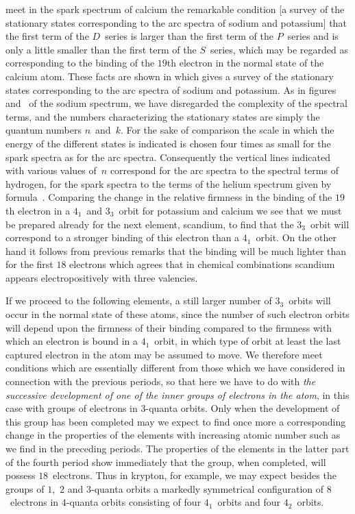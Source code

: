 meet in the spark spectrum of calcium the remarkable condition
[a survey of the stationary states corresponding to the arc spectra of sodium and potassium]
that the first term of the $D$~series is larger than the first term of
the $P$~series and is only a little smaller than the first term of the
$S$~series, which may be regarded as corresponding to the binding
of the $19$th electron in the normal state of the calcium atom.
These facts are shown in  which gives a survey of the
stationary states corresponding to the arc spectra of sodium and
potassium. As in figures  and~ of the sodium spectrum, we
have disregarded the complexity of the spectral terms, and the
numbers characterizing the stationary states are simply the quantum
numbers $n$~and~$k$. For the sake of comparison the scale in which the
energy of the different states is indicated is chosen four times as
small for the spark spectra as for the arc spectra. Consequently
the vertical lines indicated with various values of~$n$ correspond for
the arc spectra to the spectral terms of hydrogen, for the spark
spectra to the terms of the helium spectrum given by formula~.
Comparing the change in the relative firmness in the binding of
the $19$th electron in a $4_{1}$~and $3_{3}$~orbit for potassium and calcium we
see that we must be prepared already for the next element,
scandium, to find that the $3_{3}$~orbit will correspond to a stronger
binding of this electron than a $4_{1}$~orbit. On the other hand it
follows from previous remarks that the binding will be much lighter
than for the first $18$ electrons which agrees that in chemical combinations
scandium appears electropositively with three valencies.

If we proceed to the following elements, a still larger number of
$3_{3}$~orbits will occur in the normal state of these atoms, since the
number of such electron orbits will depend upon the firmness of
their binding compared to the firmness with which an electron is
bound in a $4_{1}$~orbit, in which type of orbit at least the last captured
electron in the atom may be assumed to move. We therefore meet
conditions which are essentially different from those which we have
considered in connection with the previous periods, so that here
we have to do with \emph{the successive development of one of the inner
groups of electrons in the atom}, in this case with groups of electrons
in $3$-quanta orbits. Only when the development of this group has
been completed may we expect to find once more a corresponding
change in the properties of the elements with increasing atomic
number such as we find in the preceding periods. The properties
of the elements in the latter part of the fourth period show
immediately that the group, when completed, will possess $18$~electrons.
Thus in krypton, for example, we may expect besides
the groups of $1$,~$2$ and $3$-quanta orbits a markedly symmetrical
configuration of $8$~electrons in $4$-quanta orbits consisting of four $4_{1}$~orbits
and four $4_{2}$~orbits.

